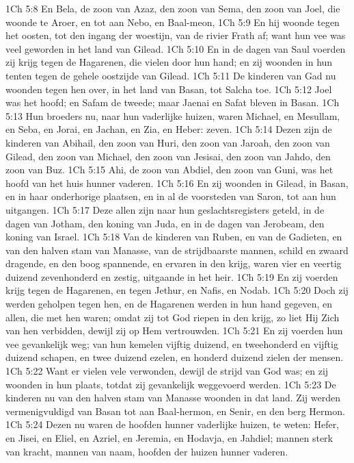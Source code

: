 1Ch 5:8  En Bela, de zoon van Azaz, den zoon van Sema, den zoon van Joel, die woonde te Aroer, en tot aan Nebo, en Baal-meon,
1Ch 5:9  En hij woonde tegen het oosten, tot den ingang der woestijn, van de rivier Frath af; want hun vee was veel geworden in het land van Gilead.
1Ch 5:10  En in de dagen van Saul voerden zij krijg tegen de Hagarenen, die vielen door hun hand; en zij woonden in hun tenten tegen de gehele oostzijde van Gilead.
1Ch 5:11  De kinderen van Gad nu woonden tegen hen over, in het land van Basan, tot Salcha toe.
1Ch 5:12  Joel was het hoofd; en Safam de tweede; maar Jaenai en Safat bleven in Basan.
1Ch 5:13  Hun broeders nu, naar hun vaderlijke huizen, waren Michael, en Mesullam, en Seba, en Jorai, en Jachan, en Zia, en Heber: zeven.
1Ch 5:14  Dezen zijn de kinderen van Abihail, den zoon van Huri, den zoon van Jaroah, den zoon van Gilead, den zoon van Michael, den zoon van Jesisai, den zoon van Jahdo, den zoon van Buz.
1Ch 5:15  Ahi, de zoon van Abdiel, den zoon van Guni, was het hoofd van het huis hunner vaderen.
1Ch 5:16  En zij woonden in Gilead, in Basan, en in haar onderhorige plaatsen, en in al de voorsteden van Saron, tot aan hun uitgangen.
1Ch 5:17  Deze allen zijn naar hun geslachtsregisters geteld, in de dagen van Jotham, den koning van Juda, en in de dagen van Jerobeam, den koning van Israel.
1Ch 5:18  Van de kinderen van Ruben, en van de Gadieten, en van den halven stam van Manasse, van de strijdbaarste mannen, schild en zwaard dragende, en den boog spannende, en ervaren in den krijg, waren vier en veertig duizend zevenhonderd en zestig, uitgaande in het heir.
1Ch 5:19  En zij voerden krijg tegen de Hagarenen, en tegen Jethur, en Nafis, en Nodab.
1Ch 5:20  Doch zij werden geholpen tegen hen, en de Hagarenen werden in hun hand gegeven, en allen, die met hen waren; omdat zij tot God riepen in den krijg, zo liet Hij Zich van hen verbidden, dewijl zij op Hem vertrouwden.
1Ch 5:21  En zij voerden hun vee gevankelijk weg; van hun kemelen vijftig duizend, en tweehonderd en vijftig duizend schapen, en twee duizend ezelen, en honderd duizend zielen der mensen.
1Ch 5:22  Want er vielen vele verwonden, dewijl de strijd van God was; en zij woonden in hun plaats, totdat zij gevankelijk weggevoerd werden.
1Ch 5:23  De kinderen nu van den halven stam van Manasse woonden in dat land. Zij werden vermenigvuldigd van Basan tot aan Baal-hermon, en Senir, en den berg Hermon.
1Ch 5:24  Dezen nu waren de hoofden hunner vaderlijke huizen, te weten: Hefer, en Jisei, en Eliel, en Azriel, en Jeremia, en Hodavja, en Jahdiel; mannen sterk van kracht, mannen van naam, hoofden der huizen hunner vaderen.

